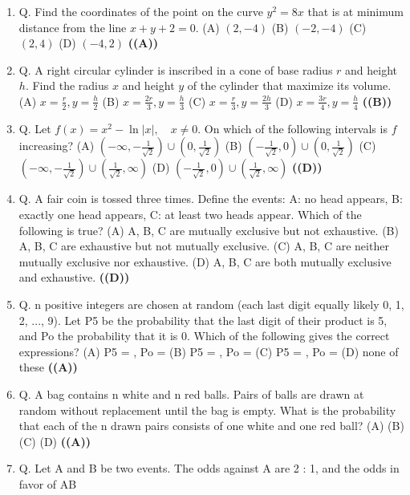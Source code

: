 \documentclass{article}
\begin{document}
\begin{enumerate}
\item Q. Find the coordinates of the point on the curve
$y^2 = 8x$
that is at minimum distance from the line
$x + y + 2 = 0$.
(A) $(2, -4)$
(B) $(-2, -4)$
(C) $(2, 4)$
(D) $(-4, 2)$ \hfill \textbf{((A))}
\item Q. A right circular cylinder is inscribed in a cone of base radius $r$ and height $h$. Find the
radius $x$ and height $y$ of the cylinder that maximize its volume.
(A) $x = \frac{r}{2}, y = \frac{h}{2}$
(B) $x = \frac{2r}{3}, y = \frac{h}{3}$
(C) $x = \frac{r}{3}, y = \frac{2h}{3}$
(D) $x = \frac{3r}{4}, y = \frac{h}{4}$ \hfill \textbf{((B))}
\item Q. Let
$f(x) = x^2 - \ln |x|, \quad x \neq 0$.
On which of the following intervals is $f$ increasing?
(A) $(-\infty, -\frac{1}{\sqrt{2}}) \cup (0, \frac{1}{\sqrt{2}})$
(B) $(-\frac{1}{\sqrt{2}}, 0) \cup (0, \frac{1}{\sqrt{2}})$
(C) $(-\infty, -\frac{1}{\sqrt{2}}) \cup (\frac{1}{\sqrt{2}}, \infty)$
(D) $(-\frac{1}{\sqrt{2}}, 0) \cup (\frac{1}{\sqrt{2}}, \infty)$ \hfill \textbf{((D))}
\item Q. A fair coin is tossed three times. Define the events:
A: no head appears, B: exactly one head appears,
C: at least two heads appear.
Which of the following is true?
(A) A, B, C are mutually exclusive but not exhaustive.
(B) A, B, C are exhaustive but not mutually exclusive.
(C) A, B, C are neither mutually exclusive nor exhaustive.
(D) A, B, C are both mutually exclusive and exhaustive. \hfill \textbf{((D))}
\item Q. n positive integers are chosen at random (each last digit equally likely 0, 1, 2, ..., 9). Let
P5 be the probability that the last digit of their product is 5, and Po the probability that it
is 0. Which of the following gives the correct expressions?
(A) P5 = , Po = 
(B) P5 = , Po = 
(C) P5 = , Po = 
(D) none of these \hfill \textbf{((A))}
\item Q. A bag contains n white and n red balls. Pairs of balls are drawn at random without
replacement until the bag is empty. What is the probability that each of the n drawn pairs
consists of one white and one red ball?
(A) 
(B) 
(C) 
(D)  \hfill \textbf{((A))}
\item Q. Let A and B be two events. The odds against A are 2 : 1, and the odds in favor of A\cup B

\end{enumerate}
\end{document}
